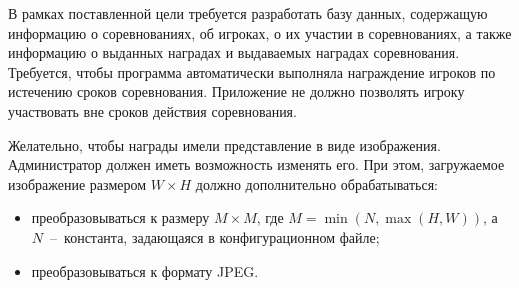



В рамках поставленной цели требуется разработать базу данных, содержащую информацию о соревнованиях, об игроках, о их участии в соревнованиях, а также информацию о выданных наградах и выдаваемых наградах соревнования. Требуется, чтобы программа автоматически выполняла награждение игроков по истечению сроков соревнования. Приложение не должно позволять игроку участвовать вне сроков действия соревнования. 

Желательно, чтобы награды имели представление в виде изображения. Администратор должен иметь возможность изменять его. При этом, загружаемое изображение размером $W \times H$ должно дополнительно обрабатываться:
\begin{itemize}
	\item преобразовываться к размеру $M \times M$, где $M=\min(N,\max(H,W))$, а $N$~--~константа, задающаяся в конфигурационном файле;
	\item преобразовываться к формату JPEG.
\end{itemize}


